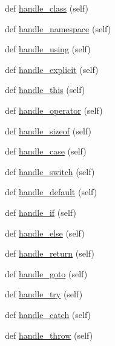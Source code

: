 \begin{DoxyCompactItemize}
\item 
def \hyperlink{classcpp_1_1ast_1_1_ast_builder_a93bd39632593bec36972355b7e1893e0}{handle\+\_\+class} (self)
\item 
def \hyperlink{classcpp_1_1ast_1_1_ast_builder_ae6dde01c5f9ac7ba3b14dff01cac66e4}{handle\+\_\+namespace} (self)
\item 
def \hyperlink{classcpp_1_1ast_1_1_ast_builder_a785563f31bc3ed9559d9ce2854a83f1b}{handle\+\_\+using} (self)
\item 
def \hyperlink{classcpp_1_1ast_1_1_ast_builder_a568860050542b53d3df9cf479f2a5e1c}{handle\+\_\+explicit} (self)
\item 
def \hyperlink{classcpp_1_1ast_1_1_ast_builder_ad96a39776b5439fa9a5c2989f8da20cd}{handle\+\_\+this} (self)
\item 
def \hyperlink{classcpp_1_1ast_1_1_ast_builder_a7ca1318675b9eff41cb4a838d63eb6e6}{handle\+\_\+operator} (self)
\item 
def \hyperlink{classcpp_1_1ast_1_1_ast_builder_acfd733ff9115e3292bea10e160bb6184}{handle\+\_\+sizeof} (self)
\item 
def \hyperlink{classcpp_1_1ast_1_1_ast_builder_ac4f02e1ba7df670086e4c9dabdb21458}{handle\+\_\+case} (self)
\item 
def \hyperlink{classcpp_1_1ast_1_1_ast_builder_a1dffcdf7154158461a652c5b885bfa19}{handle\+\_\+switch} (self)
\item 
def \hyperlink{classcpp_1_1ast_1_1_ast_builder_a6bf895d948d231ffcd058df7af05d0be}{handle\+\_\+default} (self)
\item 
def \hyperlink{classcpp_1_1ast_1_1_ast_builder_a39f2561dfcf36485b2050dff258ece2b}{handle\+\_\+if} (self)
\item 
def \hyperlink{classcpp_1_1ast_1_1_ast_builder_aeb676b03467a93454be018ac243f89a2}{handle\+\_\+else} (self)
\item 
def \hyperlink{classcpp_1_1ast_1_1_ast_builder_a8330d1f34d40b0e82495ec794575289d}{handle\+\_\+return} (self)
\item 
def \hyperlink{classcpp_1_1ast_1_1_ast_builder_a8504d788bb1541ee581918d52d1f4132}{handle\+\_\+goto} (self)
\item 
def \hyperlink{classcpp_1_1ast_1_1_ast_builder_a6c7998f3fdcd046718ff809dbe257645}{handle\+\_\+try} (self)
\item 
def \hyperlink{classcpp_1_1ast_1_1_ast_builder_aa38687383d0f54d26416054cf2141837}{handle\+\_\+catch} (self)
\item 
def \hyperlink{classcpp_1_1ast_1_1_ast_builder_ad4a308ded4a1f87e686b9e11fec31be9}{handle\+\_\+throw} (self)

\end{DoxyCompactItemize}
